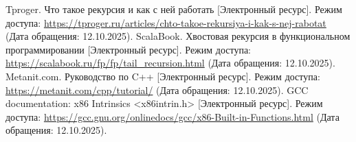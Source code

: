 \begin{thebibliography}{}
	 Tproger. Что такое рекурсия и как с ней работать [Электронный ресурс]. Режим доступа: \url{https://tproger.ru/articles/chto-takoe-rekursiya-i-kak-s-nej-rabotat} (Дата обращения: 12.10.2025).
	 ScalaBook. Хвостовая рекурсия в функциональном программировании [Электронный ресурс]. Режим доступа: \url{https://scalabook.ru/fp/fp/tail_recursion.html} (Дата обращения: 12.10.2025).
	 Metanit.com. Руководство по C++ [Электронный ресурс]. Режим доступа: \url{https://metanit.com/cpp/tutorial/} (Дата обращения: 12.10.2025).
	 GCC documentation: x86 Intrinsics <x86intrin.h> [Электронный ресурс]. Режим доступа: \url{https://gcc.gnu.org/onlinedocs/gcc/x86-Built-in-Functions.html} (Дата обращения: 12.10.2025).
\end{thebibliography}

